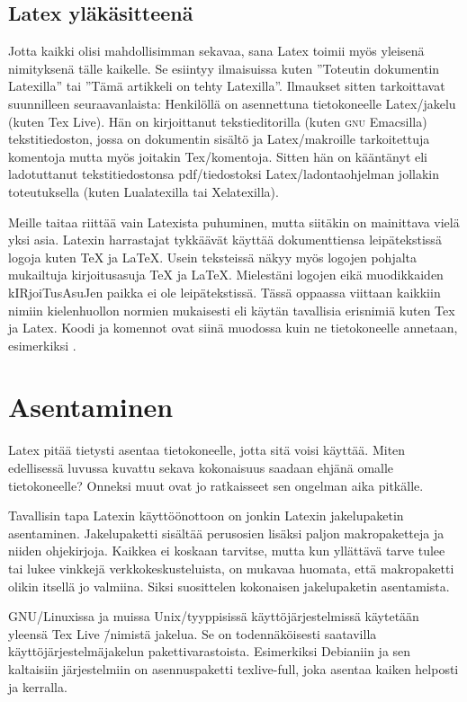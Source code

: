 \subsection{Latex yläkäsitteenä}

Jotta kaikki olisi mahdollisimman sekavaa, sana Latex toimii myös
yleisenä nimityksenä tälle kaikelle. Se esiintyy ilmaisuissa kuten
''Toteutin dokumentin Latexilla'' tai ''Tämä artikkeli on tehty
Latexilla''. Ilmaukset sitten tarkoittavat suunnilleen seuraavanlaista:
Henkilöllä on asennettuna tietokoneelle Latex\-/jakelu (kuten Tex Live).
Hän on kirjoittanut tekstieditorilla (kuten \textsc{gnu} Emacsilla)
tekstitiedoston, jossa on dokumentin sisältö ja Latex\-/makroille
tarkoitettuja komentoja mutta myös joitakin Tex\-/komentoja. Sitten hän
on kääntänyt eli ladotuttanut tekstitiedostonsa pdf\-/tiedostoksi
Latex\-/ladontaohjelman jollakin toteutuksella (kuten Lualatexilla tai
Xelatexilla).

Meille taitaa riittää vain Latexista puhuminen, mutta siitäkin on
mainittava vielä yksi asia. Latexin harrastajat tykkäävät käyttää
dokumenttiensa leipätekstissä logoja kuten \TeX{} ja \LaTeX{}. Usein
teksteissä näkyy myös logojen pohjalta mukailtuja kir\-joi\-tus\-asu\-ja
TeX ja LaTeX. Mielestäni logojen eikä muodikkaiden
kIR\-joi\-Tus\-Asu\-Jen paikka ei ole leipätekstissä. Tässä oppaassa
viittaan kaikkiin nimiin kielenhuollon normien mukaisesti eli käytän
tavallisia erisnimiä kuten Tex ja Latex. Koodi ja komennot ovat siinä
muodossa kuin ne tietokoneelle annetaan, esimerkiksi .

\section{Asentaminen}
\label{luku:asentaminen}

Latex pitää tietysti asentaa tietokoneelle, jotta sitä voisi käyttää.
Miten edellisessä luvussa kuvattu sekava kokonaisuus saadaan ehjänä
omalle tietokoneelle? Onneksi muut ovat jo ratkaisseet sen ongelman aika
pitkälle.

Tavallisin tapa Latexin käyttöönottoon on jonkin Latexin jakelupaketin
asentaminen. Jakelupaketti sisältää perusosien lisäksi paljon
makropaketteja ja niiden ohjekirjoja. Kaikkea ei koskaan tarvitse, mutta
kun yllättävä tarve tulee tai lukee vinkkejä verkkokeskusteluista, on
mukavaa huomata, että makropaketti olikin itsellä jo valmiina. Siksi
suosittelen kokonaisen jakelupaketin asentamista.

GNU/Linuxissa ja muissa Unix\-/tyyppisissä käyttöjärjestelmissä
käytetään yleensä Tex Live \=/nimistä jakelua. Se on todennäköisesti
saatavilla käyttöjärjestelmäjakelun pakettivarastoista. Esimerkiksi
Debianiin ja sen kaltaisiin järjestelmiin on asennuspaketti
texlive-full, joka asentaa kaiken helposti ja kerralla.

